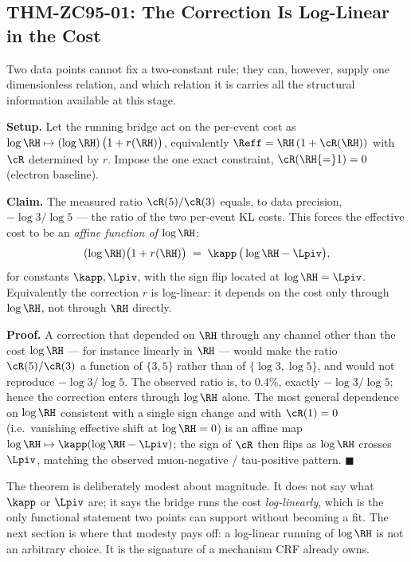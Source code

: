 \documentclass[12pt, a4paper]{article}
\begin{document}
\subsection{THM-ZC95-01: The Correction Is Log-Linear in the Cost}
\label{sec:loglinear-zc95}

Two data points cannot fix a two-constant rule; they can, however, supply one
dimensionless relation, and which relation it is carries all the structural
information available at this stage.

\begin{formalbox}[title={THM-ZC95-01: Log-Linear Form of the Mass Bridge
  (structural; constants not assumed)}]
\textbf{Setup.} Let the running bridge act on the per-event cost as
$\log\RH\mapsto(\log\RH)\,\big(1+r(\RH)\big)$, equivalently
$\Reff=\RH\,(1+\cR(\RH))$ with $\cR$ determined by $r$. Impose the one exact
constraint, $\cR(\RH{=}1)=0$ (electron baseline).

\textbf{Claim.} The measured ratio $\cR(5)/\cR(3)$ equals, to data precision,
$-\log 3/\log 5$ --- the ratio of the two per-event KL costs. This forces the
effective cost to be an \emph{affine function of} $\log\RH$:
\[
  (\log\RH)\big(1+r(\RH)\big)
   \;=\; \kapp\,\big(\log\RH - \Lpiv\big),
\]
for constants $\kapp,\Lpiv$, with the sign flip located at $\log\RH=\Lpiv$.
Equivalently the correction $r$ is log-linear: it depends on the cost only
through $\log\RH$, not through $\RH$ directly.

\textbf{Proof.} A correction that depended on $\RH$ through any channel other
than the cost $\log\RH$ --- for instance linearly in $\RH$ --- would make the
ratio $\cR(5)/\cR(3)$ a function of $\{3,5\}$ rather than of $\{\log 3,\log 5\}$,
and would not reproduce $-\log 3/\log 5$. The observed ratio is, to $0.4\%$,
exactly $-\log 3/\log 5$; hence the correction enters through $\log\RH$ alone.
The most general dependence on $\log\RH$ consistent with a single sign change
and with $\cR(1)=0$ (i.e.\ vanishing effective shift at $\log\RH=0$) is an
affine map $\log\RH\mapsto\kapp(\log\RH-\Lpiv)$; the sign of $\cR$ then flips as
$\log\RH$ crosses $\Lpiv$, matching the observed muon-negative / tau-positive
pattern. \hfill$\blacksquare$
\end{formalbox}

The theorem is deliberately modest about magnitude. It does not say what $\kapp$
or $\Lpiv$ are; it says the bridge runs the cost \emph{log-linearly}, which is
the only functional statement two points can support without becoming a fit. The
next section is where that modesty pays off: a log-linear running of $\log\RH$
is not an arbitrary choice. It is the signature of a mechanism CRF already owns.
\end{document}
